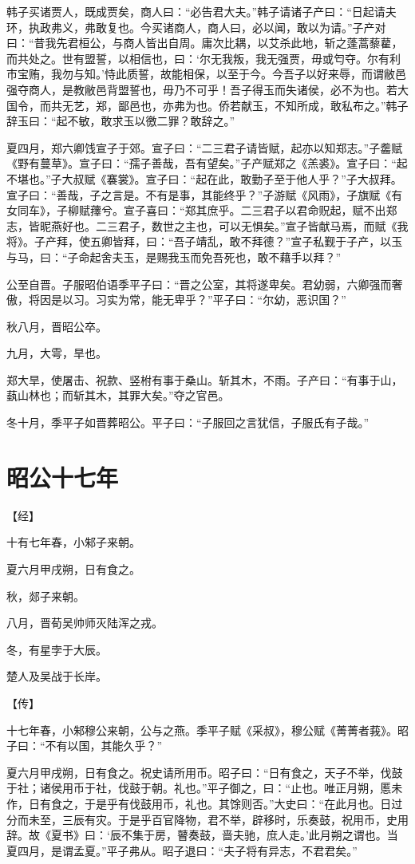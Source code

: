 \documentclass[a4paper,12pt,UTF8,twoside]{ctexbook}
\begin{document}
韩子买诸贾人，既成贾矣，商人曰：“必告君大夫。”韩子请诸子产曰：“日起请夫环，执政弗义，弗敢复也。今买诸商人，商人曰，必以闻，敢以为请。”子产对曰：“昔我先君桓公，与商人皆出自周。庸次比耦，以艾杀此地，斩之蓬蒿藜藋，而共处之。世有盟誓，以相信也，曰：‘尔无我叛，我无强贾，毋或匄夺。尔有利市宝贿，我勿与知。’恃此质誓，故能相保，以至于今。今吾子以好来辱，而谓敝邑强夺商人，是教敝邑背盟誓也，毋乃不可乎！吾子得玉而失诸侯，必不为也。若大国令，而共无艺，郑，鄙邑也，亦弗为也。侨若献玉，不知所成，敢私布之。”韩子辞玉曰：“起不敏，敢求玉以徼二罪？敢辞之。”

夏四月，郑六卿饯宣子于郊。宣子曰：“二三君子请皆赋，起亦以知郑志。”子齹赋《野有蔓草》。宣子曰：“孺子善哉，吾有望矣。”子产赋郑之《羔裘》。宣子曰：“起不堪也。”子大叔赋《褰裳》。宣子曰：“起在此，敢勤子至于他人乎？”子大叔拜。宣子曰：“善哉，子之言是。不有是事，其能终乎？”子游赋《风雨》，子旗赋《有女同车》，子柳赋蘀兮。宣子喜曰：“郑其庶乎。二三君子以君命贶起，赋不出郑志，皆昵燕好也。二三君子，数世之主也，可以无惧矣。”宣子皆献马焉，而赋《我将》。子产拜，使五卿皆拜，曰：“吾子靖乱，敢不拜德？”宣子私觐于子产，以玉与马，曰：“子命起舍夫玉，是赐我玉而免吾死也，敢不藉手以拜？”

公至自晋。子服昭伯语季平子曰：“晋之公室，其将遂卑矣。君幼弱，六卿强而奢傲，将因是以习。习实为常，能无卑乎？”平子曰：“尔幼，恶识国？”

秋八月，晋昭公卒。

九月，大雩，旱也。

郑大旱，使屠击、祝款、竖柎有事于桑山。斩其木，不雨。子产曰：“有事于山，蓺山林也；而斩其木，其罪大矣。”夺之官邑。

冬十月，季平子如晋葬昭公。平子曰：“子服回之言犹信，子服氏有子哉。”


\chapter{昭公十七年}


【经】

十有七年春，小邾子来朝。

夏六月甲戌朔，日有食之。

秋，郯子来朝。

八月，晋荀吴帅师灭陆浑之戎。

冬，有星孛于大辰。

楚人及吴战于长岸。

【传】

十七年春，小邾穆公来朝，公与之燕。季平子赋《采叔》，穆公赋《菁菁者莪》。昭子曰：“不有以国，其能久乎？”

夏六月甲戌朔，日有食之。祝史请所用币。昭子曰：“日有食之，天子不举，伐鼓于社；诸侯用币于社，伐鼓于朝。礼也。”平子御之，曰：“止也。唯正月朔，慝未作，日有食之，于是乎有伐鼓用币，礼也。其馀则否。”大史曰：“在此月也。日过分而未至，三辰有灾。于是乎百官降物，君不举，辟移时，乐奏鼓，祝用币，史用辞。故《夏书》曰：‘辰不集于房，瞽奏鼓，啬夫驰，庶人走。’此月朔之谓也。当夏四月，是谓孟夏。”平子弗从。昭子退曰：“夫子将有异志，不君君矣。”
\end{document}
